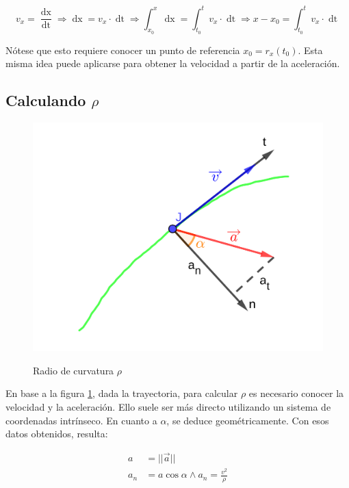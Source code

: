 \documentclass{article}
\begin{document}
\begin{equation}
v_x = \frac{ \mathop{dx} }{ \mathop{dt} } \Rightarrow \mathop{ dx } = v_x \cdot \mathop{ dt } \Rightarrow \int_{x_0}^x \mathop{ dx } = \int_{t_0}^t v_x \cdot \mathop{ dt } \Rightarrow x - x_0 = \int_{t_0}^t v_x \cdot \mathop{ dt }
\end{equation}

Nótese que esto requiere conocer un punto de referencia $x_0 = r_x(t_0)$. Esta misma idea puede aplicarse para obtener la velocidad a partir de la aceleración.

\subsection{Calculando $\rho$}

\begin{figure}[ht]
\centering
\caption{Radio de curvatura $\rho$}
\includegraphics[scale=1.3]{../../common/img/62.01/theory/02-kinematics-rho.png}
\label{fig:rho}
\end{figure}

En base a la figura \ref{fig:rho}, dada la trayectoria, para calcular $\rho$ es necesario conocer la velocidad y la aceleración. Ello suele ser más directo utilizando un sistema de coordenadas intrínseco. En cuanto a $\alpha$, se deduce geométricamente. Con esos datos obtenidos, resulta:

\begin{subequations}
\begin{align}
a &= ||\overrightarrow{a}|| \\
a_n &= a \cos \alpha \wedge a_n = \frac{v^2}{\rho}
\end{align}
\end{subequations}
\end{document}
